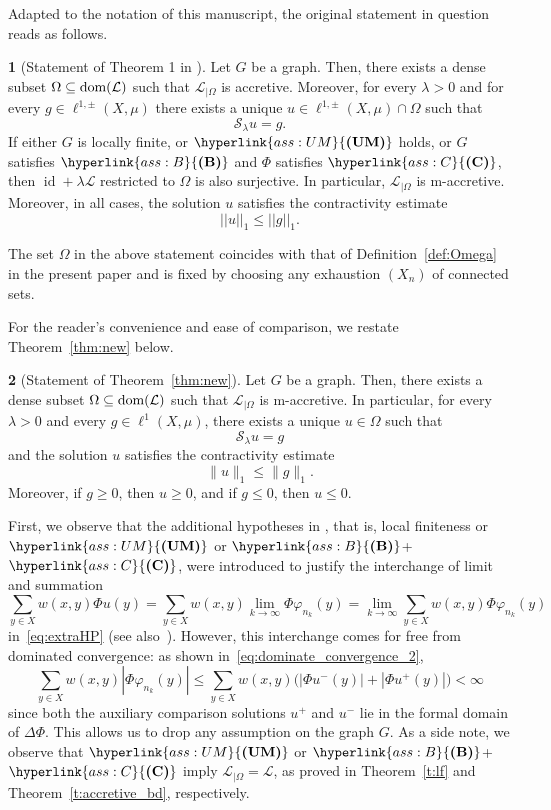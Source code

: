 \documentclass[letterpaper]{article}
\theoremstyle{definition}
\theoremstyle{named}
\newtheorem*{namedtheorem}{}
\numberwithin{equation}{section}
\newcommand{\UM}{\hyperlink{ass:UM}{\textup{\textbf{(UM)}}}}
\newcommand{\B}{\hyperlink{ass:B}{\textup{\textbf{(B)}}}}
\newcommand{\C}{\hyperlink{ass:C}{\textup{\textbf{(C)}}}}
\newcommand{\dom}{\textnormal{dom}} %
\newcommand{\Deltaphi}{\mathcal{L}}
\newcommand{\Deltaphiom}{\Deltaphi_{|\Omega}}
\begin{document}
Adapted to the notation of this manuscript, the original statement
in question reads as follows.
\begin{namedtheorem}[Statement of Theorem 1 in \cite{bianchi2022generalized}]
Let $G$ be a graph. Then, there exists a dense subset $\Omega \subseteq \dom(\Deltaphi)$ such that $\Deltaphi_{|\Omega}$ is accretive.  Moreover, for every $\lambda >0$ and for every $g \in \ell^{1,\pm}(X,\mu)$ there exists a unique $u \in \ell^{1,\pm}(X,\mu)\cap\Omega$ such that
\begin{equation*}\label{eq:main_equation}
\mathcal{S}_\lambda u=g.
\end{equation*}
If  either  $G$ is locally finite, or $\UM$ holds, or $G$ satisfies $\B$ and $\Phi$ satisfies $\C$, then 
$\operatorname{id}+\lambda\Deltaphi$ restricted to $\Omega$ is also surjective.
In particular, $\Deltaphi_{|\Omega}$ is m-accretive.
Moreover, in all cases, the solution $u$ satisfies the
contractivity estimate  $$||u||_1\leq ||g||_1.$$
\end{namedtheorem}

The set $\Omega$ in the above statement coincides with that of Definition~\ref{def:Omega} in the present paper and is fixed by choosing any exhaustion $(X_n)$ of connected sets. 

For the reader's convenience and ease of comparison, we restate Theorem~\ref{thm:new} below.

\begin{namedtheorem}[Statement of Theorem~\ref{thm:new}]
Let $G$ be a  graph. Then, there exists a dense subset $\Omega\subseteq\dom(\Deltaphi)$ such that $\Deltaphi_{|\Omega}$ is m-accretive. In particular, for every $\lambda>0$ and every $g\in \ell^{1}(X,\mu)$, there exists a unique $u\in \Omega$ such that
\[
\mathcal{S}_\lambda u=g
\]
and the solution $u$ satisfies the contractivity estimate
\[
\|u\|_1\leq \|g\|_1.
\]
Moreover, if $g\geq 0$, then $u\geq 0$, and if $g\leq 0$, then $u\leq 0$.
\end{namedtheorem}

First, we observe that the additional hypotheses in \cite[Theorem 1]{bianchi2022generalized}, that is, local finiteness or $\UM$  or $\B$+$\C$, were introduced to justify the interchange of limit and summation
$$
\sum_{y \in X} w(x,y) \Phi u(y) = \sum_{y \in X} w(x,y) \lim_{k\to\infty} \Phi \varphi_{n_k}(y) = \lim_{k\to\infty} \sum_{y \in X} w(x,y) \Phi \varphi_{n_k}(y)
$$
in~\eqref{eq:extraHP} (see also~\cite[Equation (4.24)]{bianchi2022generalized}). However, this interchange comes for free from dominated convergence: as shown in~\eqref{eq:dominate_convergence_2},
\begin{equation*}
\sum_{y\in X} w(x,y)|\Phi \varphi_{n_k}(y)|
\le
\sum_{y\in X} w(x,y)\bigl(|\Phi u^-(y)| + |\Phi u^+(y)|\bigr)
< \infty
\end{equation*}
since both the auxiliary comparison solutions $u^+$ and  $u^-$ lie in the formal domain of $\Delta\Phi$. This allows us to drop any assumption on the graph $G$. As a side note, we observe that $\UM$  or $\B$+$\C$ imply $\Deltaphiom = \Deltaphi$, as proved in Theorem~\ref{t:lf} and Theorem~\ref{t:accretive_bd}, respectively.
\end{document}
